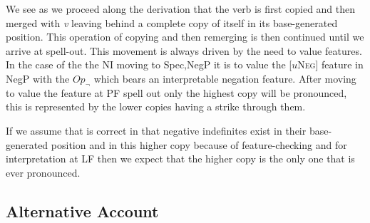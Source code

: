 \documentclass[12pt, letterpaper]{article}
\begin{document}
We see as we proceed along the derivation that the verb is first copied and then merged with \emph{v} leaving behind a complete copy of itself in its base-generated position. This operation of copying and then remerging is then continued until we arrive at spell-out. This movement is always driven by the need to value features. In the case of the the NI moving to Spec,NegP it is to value the [{$u$\textsc{Neg}}] feature in NegP with the $Op_\neg$ which bears an interpretable negation feature. After moving to value the feature at PF spell out only the highest copy will be pronounced, this is represented by the lower copies having a strike through them. 
\ea \label{ex:Copy}
\z 

If we assume that \citet{zeijlstraSyntacticallyComplexStatus2011} is correct in that negative indefinites exist in their base-generated position and in this higher copy because of feature-checking and for interpretation at LF then we expect that the higher copy is the only one that is ever pronounced.

\subsection{Alternative Account} \label{sec:alternative}
\end{document}
